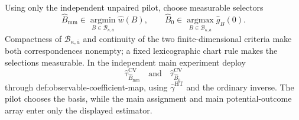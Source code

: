 Using only the independent unpaired pilot, choose measurable selectors
\[
\widehat B_{\mathrm{mm}}
\in\operatorname*{argmin}_{B\in\mathcal B_{\kappa,\overline a}}\widehat w(B),
\qquad
\widehat B_0
\in\operatorname*{argmax}_{B\in\mathcal B_{\kappa,\overline a}}\widehat g_B(0).
\]
Compactness of \(\mathcal B_{\kappa,\overline a}\) and continuity of the two finite-dimensional criteria make both correspondences nonempty; a fixed lexicographic chart rule makes the selections measurable.  In the independent main experiment deploy
\[
\widehat\tau_{\widehat B_{\mathrm{mm}}}^{\mathrm{CV}}
\quad\text{and}\quad
\widehat\tau_{\widehat B_0}^{\mathrm{CV}}
\]
through def:observable-coefficient-map, using \(\widehat\gamma^{\mathrm{HT}}\) and the ordinary inverse.  The pilot chooses the basis, while the main assignment and main potential-outcome array enter only the displayed estimator.